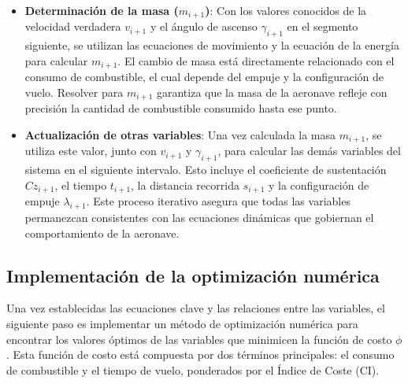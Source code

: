 \documentclass[fleqn]{article}
\begin{document}
\begin{itemize}
    \item \textbf{Determinación de la masa ($m_{i+1}$)}: Con los valores conocidos de la velocidad verdadera $v_{i+1}$ y el ángulo de ascenso $\gamma_{i+1}$ en el segmento siguiente, se utilizan las ecuaciones de movimiento y la ecuación de la energía para calcular $m_{i+1}$. El cambio de masa está directamente relacionado con el consumo de combustible, el cual depende del empuje y la configuración de vuelo. Resolver para $m_{i+1}$ garantiza que la masa de la aeronave refleje con precisión la cantidad de combustible consumido hasta ese punto.

    \item \textbf{Actualización de otras variables}: Una vez calculada la masa $m_{i+1}$, se utiliza este valor, junto con $v_{i+1}$ y $\gamma_{i+1}$, para calcular las demás variables del sistema en el siguiente intervalo. Esto incluye el coeficiente de sustentación $Cz_{i+1}$, el tiempo $t_{i+1}$, la distancia recorrida $s_{i+1}$ y la configuración de empuje $\lambda_{i+1}$. Este proceso iterativo asegura que todas las variables permanezcan consistentes con las ecuaciones dinámicas que gobiernan el comportamiento de la aeronave.
\end{itemize}

\subsection{Implementación de la optimización numérica}

Una vez establecidas las ecuaciones clave y las relaciones entre las variables, el siguiente paso es implementar un método de optimización numérica para encontrar los valores óptimos de las variables que minimicen la función de costo $\phi$. Esta función de costo está compuesta por dos términos principales: el consumo de combustible y el tiempo de vuelo, ponderados por el Índice de Coste (CI). 
\end{document}
